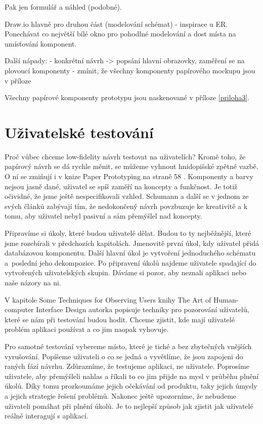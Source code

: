 Pak jen formulář a náhled (podobné).

Draw.io hlavně pro druhou část (modelování schémat) - inspirace u ER. Ponechávat co největší bílé okno pro pohodlné modelování a dost místa na umísťování komponent.

Další nápady:
- konkrétní návrh -> popsání hlavní obrazovky, zaměření se na plovoucí komponenty
- zmínit, že všechny komponenty papírového mockupu jsou v příloze

Všechny papírové komponenty prototypu jsou naskenované v příloze \ref{priloha3}.

\section{Uživatelské testování}

Proč vůbec chceme low-fidelity návrh testovat na uživatelích? Kromě toho, že papírový návrh se dá rychle měnit, se můžeme vyhnout hnidopišské zpětné vazbě. O ní se zmiňují i v knize Paper Prototyping na straně 58 \cite{Paper_Prototyping}. Komponenty a barvy nejsou jasně dané, uživatel se spíš zaměří na koncepty a funkčnost. Je totiž očividné, že jsme ještě nespecifikovali vzhled. Schumann a další se v jednom ze svých článků \cite{Schumann_1996_AEN} zabývají tím, že nedokončený návrh povzbuzuje ke kreativitě a k tomu, aby uživatel nebyl pasivní a sám přemýšlel nad koncepty. 

Připravíme si úkoly, které budou uživatelé dělat. Budou to ty nejběžnější, které jsme rozebírali v předchozích kapitolách. Jmenovitě první úkol, kdy uživatel přidá databázovou komponentu. Další hlavní úkol je vytvoření jednoduchého schématu a~poslední jeho dekompozice.
Po připravení úkolů najdeme uživatele spadající do vytvořených uživatelských skupin. Dáváme si pozor, aby neznali aplikaci nebo naše názory na ni.

V kapitole Some Techniques for Observing Users knihy The Art of Human-computer Interface Design \cite{Brenda_1990_art} autorka popisuje techniky pro pozorování uživatelů, které se nám při testování budou hodit. Chceme zjistit, kde mají uživatelé problém aplikaci používat a co jim naopak vyhovuje.

Pro samotné testování vybereme místo, které je tiché a bez zbytečných vnějších vyrušování. Popíšeme uživateli o co se jedná a vyvětlíme, že jsou zapojeni do raných fází návrhu. Zdůrazníme, že testujeme aplikaci, ne uživatele. Poprosíme uživatele, aby přemýšleli nahlas a říkali to co jim přijde na mysl v průběhu plnění úkolů. Díky tomu prozkoumáme jejich očekávání od produktu, taky jejich úmysly a jejich strategie řešení problémů. Nakonec ještě upozorníme, že nebudeme uživateli pomáhat při plnění úkolů. Je to nejlepší způsob jak zjistit jak uživatelé reálně interagují s aplikací.

